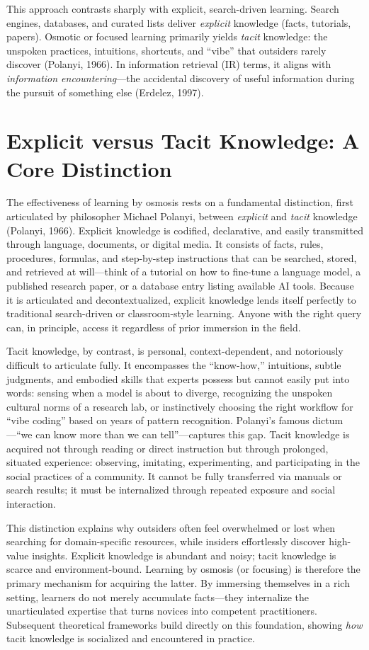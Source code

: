 \documentclass[11pt,a4paper]{article}
\begin{document}
This approach contrasts sharply with explicit, search-driven learning. Search engines, databases, and curated lists deliver \emph{explicit} knowledge (facts, tutorials, papers). Osmotic or focused learning primarily yields \emph{tacit} knowledge: the unspoken practices, intuitions, shortcuts, and ``vibe'' that outsiders rarely discover (Polanyi, 1966). In information retrieval (IR) terms, it aligns with \emph{information encountering}---the accidental discovery of useful information during the pursuit of something else (Erdelez, 1997).

\section{Explicit versus Tacit Knowledge: A Core Distinction}
The effectiveness of learning by osmosis rests on a fundamental distinction, first articulated by philosopher Michael Polanyi, between \emph{explicit} and \emph{tacit} knowledge (Polanyi, 1966). Explicit knowledge is codified, declarative, and easily transmitted through language, documents, or digital media. It consists of facts, rules, procedures, formulas, and step-by-step instructions that can be searched, stored, and retrieved at will---think of a tutorial on how to fine-tune a language model, a published research paper, or a database entry listing available AI tools. Because it is articulated and decontextualized, explicit knowledge lends itself perfectly to traditional search-driven or classroom-style learning. Anyone with the right query can, in principle, access it regardless of prior immersion in the field.

Tacit knowledge, by contrast, is personal, context-dependent, and notoriously difficult to articulate fully. It encompasses the ``know-how,'' intuitions, subtle judgments, and embodied skills that experts possess but cannot easily put into words: sensing when a model is about to diverge, recognizing the unspoken cultural norms of a research lab, or instinctively choosing the right workflow for ``vibe coding'' based on years of pattern recognition. Polanyi's famous dictum---``we can know more than we can tell''---captures this gap. Tacit knowledge is acquired not through reading or direct instruction but through prolonged, situated experience: observing, imitating, experimenting, and participating in the social practices of a community. It cannot be fully transferred via manuals or search results; it must be internalized through repeated exposure and social interaction.

This distinction explains why outsiders often feel overwhelmed or lost when searching for domain-specific resources, while insiders effortlessly discover high-value insights. Explicit knowledge is abundant and noisy; tacit knowledge is scarce and environment-bound. Learning by osmosis (or focusing) is therefore the primary mechanism for acquiring the latter. By immersing themselves in a rich setting, learners do not merely accumulate facts---they internalize the unarticulated expertise that turns novices into competent practitioners. Subsequent theoretical frameworks build directly on this foundation, showing \emph{how} tacit knowledge is socialized and encountered in practice.
\end{document}
